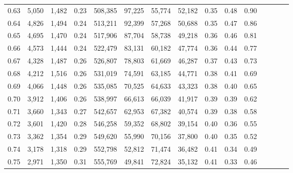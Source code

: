 \begin{tabular}{rrrcrrrrrrrrrrr}
0.63 &   5,050 &   1,482 &                                       0.23 &  508,385 &   97,225 &   55,774 &   52,182 &  0.35 &  0.48 &                         0.90 \\
0.64 &   4,826 &   1,494 &                                       0.24 &  513,211 &   92,399 &   57,268 &   50,688 &  0.35 &  0.47 &                         0.86 \\
0.65 &   4,695 &   1,470 &                                       0.24 &  517,906 &   87,704 &   58,738 &   49,218 &  0.36 &  0.46 &                         0.81 \\
0.66 &   4,573 &   1,444 &                                       0.24 &  522,479 &   83,131 &   60,182 &   47,774 &  0.36 &  0.44 &                         0.77 \\
0.67 &   4,328 &   1,487 &                                       0.26 &  526,807 &   78,803 &   61,669 &   46,287 &  0.37 &  0.43 &                         0.73 \\
0.68 &   4,212 &   1,516 &                                       0.26 &  531,019 &   74,591 &   63,185 &   44,771 &  0.38 &  0.41 &                         0.69 \\
0.69 &   4,066 &   1,448 &                                       0.26 &  535,085 &   70,525 &   64,633 &   43,323 &  0.38 &  0.40 &                         0.65 \\
0.70 &   3,912 &   1,406 &                                       0.26 &  538,997 &   66,613 &   66,039 &   41,917 &  0.39 &  0.39 &                         0.62 \\
0.71 &   3,660 &   1,343 &                                       0.27 &  542,657 &   62,953 &   67,382 &   40,574 &  0.39 &  0.38 &                         0.58 \\
0.72 &   3,601 &   1,420 &                                       0.28 &  546,258 &   59,352 &   68,802 &   39,154 &  0.40 &  0.36 &                         0.55 \\
0.73 &   3,362 &   1,354 &                                       0.29 &  549,620 &   55,990 &   70,156 &   37,800 &  0.40 &  0.35 &                         0.52 \\
0.74 &   3,178 &   1,318 &                                       0.29 &  552,798 &   52,812 &   71,474 &   36,482 &  0.41 &  0.34 &                         0.49 \\
0.75 &   2,971 &   1,350 &                                       0.31 &  555,769 &   49,841 &   72,824 &   35,132 &  0.41 &  0.33 &                         0.46 \\

\end{tabular}
